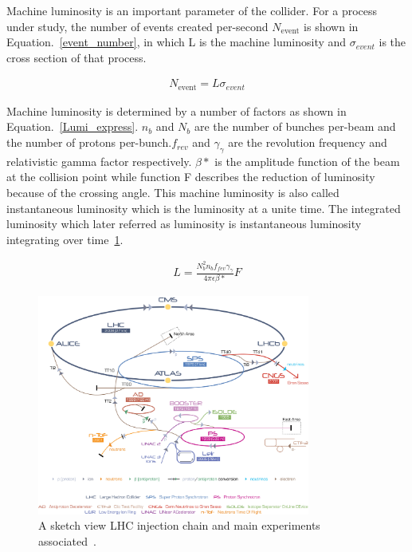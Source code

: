 Machine luminosity is an important parameter of the collider. For a process under study, the number of events created per-second $N_{\textrm{event}}$ is shown in Equation.~\ref{event_number}, in which L is the machine luminosity and $\sigma_{event}$ is the cross section of that process.

\begin{align}\label{event_number}
N_{\textrm{event}}=L\sigma_{event}
\end{align}

Machine luminosity is determined by a number of factors as shown in Equation.~\ref{Lumi_express}. $n_b$ and $N_{b}$ are the number of bunches per-beam and the number of protons per-bunch.$f_{rev}$ and $\gamma_{\gamma}$ are the revolution frequency and relativistic gamma factor respectively. $\beta*$ is the amplitude function of the beam at the collision point while function F describes the reduction of luminosity because of the crossing angle. This machine luminosity is also called instantaneous luminosity which is the luminosity at a unite time. The integrated luminosity which later referred as luminosity is instantaneous luminosity integrating over time~\ref{fig:LHC_sketch}.  

\begin{align}\label{Lumi_express}
L=\frac{N_{b}^{2}n_{b}f_{fev}\gamma_{\gamma}}{4\pi\epsilon\beta*}F
\end{align}



\begin{figure}[htbp] 
\centering
\includegraphics[width=0.8\textwidth]{chapter3/LHC_chain.jpg}
\caption{A sketch view LHC injection chain and main experiments associated~\cite{Christiane:1260465}.}
\label{fig:LHC_sketch}
\end{figure}



